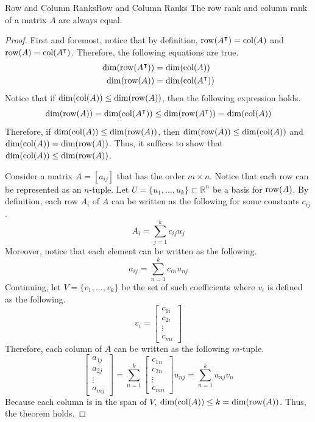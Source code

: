 \documentclass[../main.tex]{subfiles}
\begin{document}
\begin{theorem}{Row and Column Ranks}{Row and Column Ranks}
The row rank and column rank of a matrix $A$ are always equal.
\end{theorem}
\begin{proof}
First and foremost, notice that by definition, $\operatorname{row}(A^\intercal) =
\operatorname{col}(A)$ and $\operatorname{row}(A) = \operatorname{col}(A^\intercal)$. Therefore, the following
equations are true.
\begin{align*}
    \dim(\operatorname{row}(A^\intercal)) &= \dim(\operatorname{col}(A)) \\
    \dim(\operatorname{row}(A)) &= \dim(\operatorname{col}(A^\intercal))
\end{align*}
Notice that if $\dim(\operatorname{col}(A)) \leq \dim(\operatorname{row}(A))$, then the following
expression holds.
\[
\dim(\operatorname{row}(A)) = \dim(\operatorname{col}(A^\intercal))
\leq
\dim(\operatorname{row}(A^\intercal)) = \dim(\operatorname{col}(A))
\]
Therefore, if $\dim(\operatorname{col}(A)) \leq \dim(\operatorname{row}(A))$, then $\dim(\operatorname{row}(A))
\leq \dim(\operatorname{col}(A))$ and $\dim(\operatorname{col}(A)) = \dim(\operatorname{row}(A))$. Thus, it
suffices to show that $\dim(\operatorname{col}(A)) \leq \dim(\operatorname{row}(A))$.

Consider a matrix $A = [a_{ij}]$ that has the order $m \times n$.
Notice that each row can be represented as an $n$-tuple. Let $U =
\{ u_1, \ldots, u_k \} \subset \mathbb{R}^n$ be a basis for $\operatorname{row}(A)$.
By definition, each row $A_i$ of $A$ can be written as the following
for some constants $c_{ij}$.
\[
A_i
= \sum_{j=1}^k c_{ij} u_j
\]
Moreover, notice that each element can be written as the following.
\[
a_{ij}
= \sum_{n=1}^k c_{in} u_{nj}
\]
Continuing, let $V = \{ v_1, \ldots, v_k \}$ be the set of such
coefficients where $v_i$ is defined as the following.
\[
v_i =
\begin{bmatrix}
    c_{1i} \\
    c_{2i} \\
    \vdots \\
    c_{mi}
\end{bmatrix}
\]
Therefore, each column of $A$ can be written as the following
$m$-tuple.
\[
\begin{bmatrix}
    a_{1j} \\
    a_{2j} \\
    \vdots \\
    a_{mj}
\end{bmatrix}
=
\sum_{n=1}^k
\begin{bmatrix}
    c_{1n} \\
    c_{2n} \\
    \vdots \\
    c_{mn}
\end{bmatrix}
u_{nj}
= \sum_{n=1}^k u_{nj} v_n
\]
Because each column is in the span of $V$, $\dim(\operatorname{col}(A)) \leq k =
\dim(\operatorname{row}(A))$. Thus, the theorem holds.
\end{proof}
\end{document}
